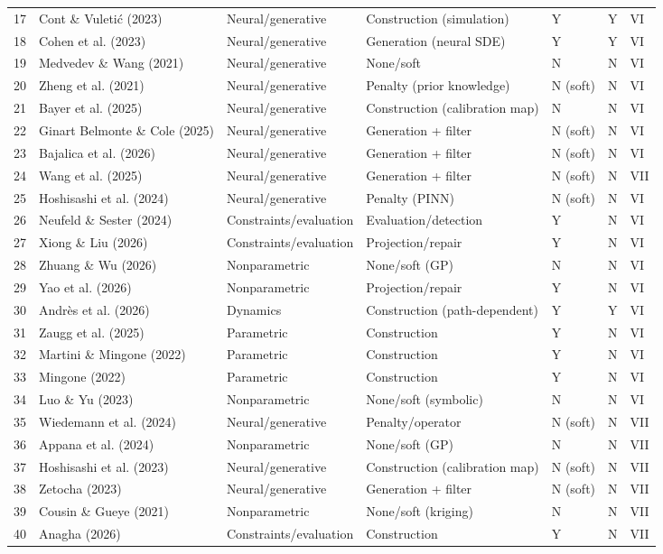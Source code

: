 \documentclass[11pt]{article}
\begin{document}
\begin{longtable}{@{}p{}p{}p{}p{}p{}p{}p{}@{}}
17 & Cont \& Vuletić (2023) & Neural/generative & Construction (simulation) & Y & Y & VI \\
18 & Cohen et al. (2023) & Neural/generative & Generation (neural SDE) & Y & Y & VI \\
19 & Medvedev \& Wang (2021) & Neural/generative & None/soft & N & N & VI \\
20 & Zheng et al. (2021) & Neural/generative & Penalty (prior knowledge) & N (soft) & N & VI \\
21 & Bayer et al. (2025) & Neural/generative & Construction (calibration map) & N & N & VI \\
22 & Ginart Belmonte \& Cole (2025) & Neural/generative & Generation + filter & N (soft) & N & VI \\
23 & Bajalica et al. (2026) & Neural/generative & Generation + filter & N (soft) & N & VI \\
24 & Wang et al. (2025) & Neural/generative & Generation + filter & N (soft) & N & VII \\
25 & Hoshisashi et al. (2024) & Neural/generative & Penalty (PINN) & N (soft) & N & VI \\
26 & Neufeld \& Sester (2024) & Constraints/evaluation & Evaluation/detection & Y & N & VI \\
27 & Xiong \& Liu (2026) & Constraints/evaluation & Projection/repair & Y & N & VI \\
28 & Zhuang \& Wu (2026) & Nonparametric & None/soft (GP) & N & N & VI \\
29 & Yao et al. (2026) & Nonparametric & Projection/repair & Y & N & VI \\
30 & Andrès et al. (2026) & Dynamics & Construction (path-dependent) & Y & Y & VI \\
31 & Zaugg et al. (2025) & Parametric & Construction & Y & N & VI \\
32 & Martini \& Mingone (2022) & Parametric & Construction & Y & N & VI \\
33 & Mingone (2022) & Parametric & Construction & Y & N & VI \\
34 & Luo \& Yu (2023) & Nonparametric & None/soft (symbolic) & N & N & VI \\
35 & Wiedemann et al. (2024) & Neural/generative & Penalty/operator & N (soft) & N & VII \\
36 & Appana et al. (2024) & Nonparametric & None/soft (GP) & N & N & VII \\
37 & Hoshisashi et al. (2023) & Neural/generative & Construction (calibration map) & N (soft) & N & VII \\
38 & Zetocha (2023) & Neural/generative & Generation + filter & N (soft) & N & VII \\
39 & Cousin \& Gueye (2021) & Nonparametric & None/soft (kriging) & N & N & VII \\
40 & Anagha (2026) & Constraints/evaluation & Construction & Y & N & VII \\
\bottomrule
\end{longtable}
\endgroup
\end{document}

